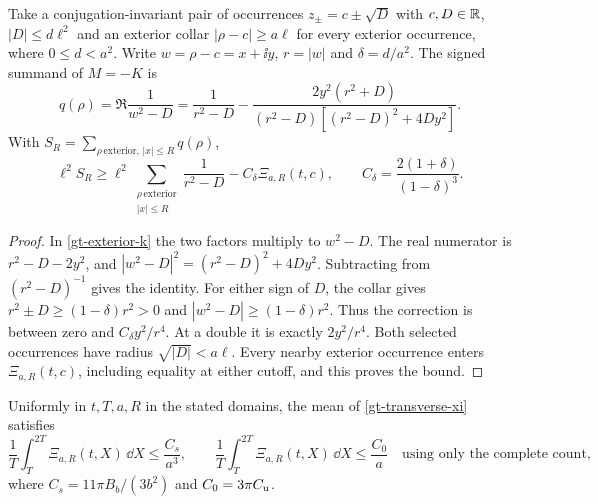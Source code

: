 \begin{proposition}
\label{gt-radial-bridge}
Take a conjugation-invariant pair of occurrences \(z_\pm=c\pm\sqrt D\)
with \(c,D\in\mathbb R\), \(|D|\le d\ell^2\) and an exterior collar
\(|\rho-c|\ge a\ell\) for every exterior occurrence, where
\(0\le d<a^2\). Write \(w=\rho-c=x+\ii y\), \(r=|w|\) and
\(\delta=d/a^2\). The signed summand of \(M=-K\) is
\begin{equation}
 q(\rho)=\Re\frac1{w^2-D}
 =\frac1{r^2-D}
  -\frac{2y^2(r^2+D)}{(r^2-D)[(r^2-D)^2+4Dy^2]} .
 \label{gt-radial-identity}
\end{equation}
With \(S_R=\sum_{\rho\,\mathrm{exterior},\,|x|\le R}q(\rho)\),
\begin{equation}
 \ell^2 S_R\ge
 \ell^2\sum_{\substack{\rho\,\mathrm{exterior}\\|x|\le R}}
    \frac1{r^2-D}-C_\delta\Xi_{a,R}(t,c),\qquad
 C_\delta=\frac{2(1+\delta)}{(1-\delta)^3}.
 \label{gt-radial-loss}
\end{equation}
\end{proposition}

\begin{proof}
In \eqref{gt-exterior-k} the two factors multiply to \(w^2-D\).
The real numerator is \(r^2-D-2y^2\), and
\(|w^2-D|^2=(r^2-D)^2+4Dy^2\). Subtracting from \((r^2-D)^{-1}\)
gives the identity. For either sign of \(D\), the collar gives
\(r^2\pm D\ge(1-\delta)r^2>0\) and
\(|w^2-D|\ge(1-\delta)r^2\). Thus the correction is between zero
and \(C_\delta y^2/r^4\). At a double it is exactly \(2y^2/r^4\).
Both selected occurrences have radius \(\sqrt{|D|}<a\ell\).
Every nearby exterior occurrence enters \(\Xi_{a,R}(t,c)\),
including equality at either cutoff, and this proves the bound.
\end{proof}

\begin{theorem}
\label{gt-averaged-transverse}
Uniformly in \(t,T,a,R\) in the stated domains, the mean of
\eqref{gt-transverse-xi} satisfies
\begin{equation}
 \frac1T\int_T^{2T}\Xi_{a,R}(t,X)\,\dd X\le\frac{C_s}{a^3},
 \qquad
 \frac1T\int_T^{2T}\Xi_{a,R}(t,X)\,\dd X\le\frac{C_0}{a}
       \quad\text{using only the complete count},
 \label{gt-xi-means}
\end{equation}
where \(C_s=11\pi B_b/(3b^2)\) and \(C_0=3\pi C_{\rm u}\).
\end{theorem}

